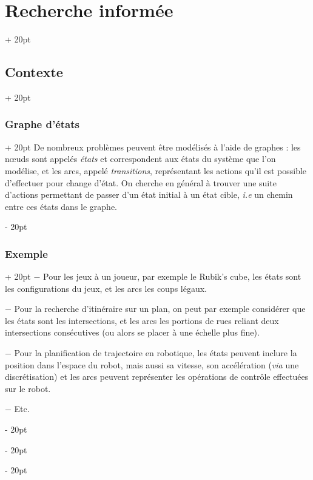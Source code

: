 \documentclass[a4paper, 12pt, twoside]{article}
\newcommand{\ind}[1][20pt]{\advance\leftskip + #1}
\newcommand{\deind}[1][20pt]{\advance\leftskip - #1}
\newenvironment{indt}[2][20pt]{#2 \par \ind[#1]}{\par \deind} %
\begin{document}
    \begin{indt}{\section{Recherche informée}}
        \begin{indt}{\subsection{Contexte}}
            \begin{indt}{\subsubsection{Graphe d'états}}
                De nombreux problèmes peuvent être modélisés à l'aide de graphes : les n\oe uds sont appelés \emph{états} et correspondent aux états du système que l'on modélise, et les arcs, appelé \emph{transitions}, représentant les actions qu'il est possible d'effectuer pour change d'état.
                On cherche en général à trouver une suite d'actions permettant de passer d'un état initial à un état cible, \textit{i.e} un chemin entre ces états dans le graphe.
            \end{indt}

            \vspace{12pt}
            
            \begin{indt}{\subsubsection{Exemple}}
                $-$ Pour les jeux à un joueur, par exemple le Rubik's cube, les états sont les configurations du jeux, et les arcs les coups légaux.

                $-$ Pour la recherche d'itinéraire sur un plan, on peut par exemple considérer que les états sont les intersections, et les arcs les portions de rues reliant deux intersections consécutives (ou alors se placer à une échelle plus fine).

                $-$ Pour la planification de trajectoire en robotique, les états peuvent inclure la position dans l'espace du robot, mais aussi sa vitesse, son accélération (\textit{via} une discrétisation) et les arcs peuvent représenter les opérations de contrôle effectuées sur le robot.

                $-$ Etc.
            \end{indt}


\end{indt}
\end{indt}
\end{document}
